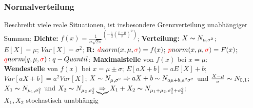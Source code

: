 \subsubsection{Normalverteilung}
Beschreibt viele reale Situationen, ist insbesondere Grenzverteilung unabhängiger Summen; 
\textbf{Dichte:} 
$f(x) = \frac{1}{\sigma\sqrt{2\pi}}^{(-\frac{1}{2}(\frac{x-\mu}{\sigma})^2)}$; 
\textbf{Verteilung:} 
$X \thicksim N_{\mu, \sigma^2} $; 
$E[X] = \mu $; 
$Var[X] = \sigma^2 $; 
\textbf{R:} 
$\textcolor{red}{d} norm(x,\mu,\textcolor{red}{\sigma})=f(x) $; 
$\textcolor{red}{p} norm(x,\mu,\textcolor{red}{\sigma})=F(x) $; 
$\textcolor{red}{q} norm(q,\mu,\textcolor{red}{\sigma}):q-Quantil $; 
\textbf{Maximalstelle} von $ f(x) $ bei $ x =\mu $; 
\textbf{Wendestelle} von $ f(x) $ bei $ x = \mu \pm \sigma $; 
$ E[aX + b] = aE[X] + b $; 
$ Var [aX + b] = a^2 Var[X] $; 
$ X \thicksim N_{\mu, \sigma^2} \Rightarrow aX + b \thicksim N_{a\mu+b, a^2\sigma^2}$ und $ \frac{X-\mu}{\sigma} \thicksim N_{0,1} $; 
$ X_ {1} \thicksim N_{\mu_{1}, \sigma_{1}^2}$ und $ X_{2} \thicksim N_{\mu_{2}, \sigma_{2}^2} \underbrace{\Rightarrow} X_{1} + X_{2} \thicksim N_{ \mu_{1} + \mu_{2}, \sigma_{1}^2 + \sigma_{2}^2} $;\\
$ X_{1}, X_{2} $ stochastisch unabhängig
